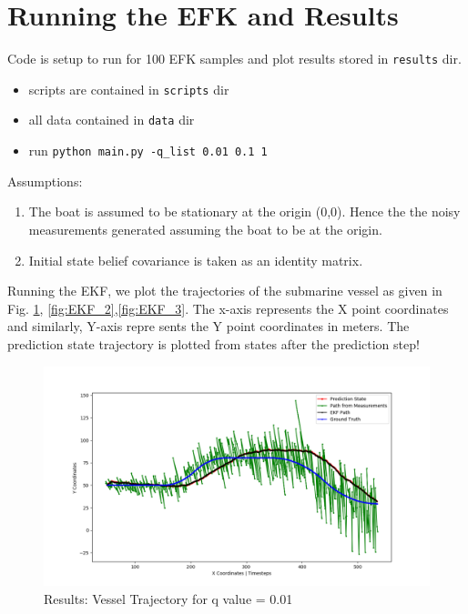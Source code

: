 \documentclass[12pt]{article}
\begin{document}
       
\section{Running the  EFK and Results}
Code is setup to run for 100 EFK samples and plot results stored in \texttt{results} dir.
\begin{itemize}
\item scripts are contained in \texttt{scripts} dir
\item all data contained in \texttt{data} dir
\item run \texttt{python main.py -q\_list 0.01 0.1 1}
\end{itemize}

Assumptions:
\begin{enumerate}
\item The boat is assumed to be stationary at the origin (0,0). Hence the the noisy measurements generated assuming the boat to be at the origin.
\item Initial state belief covariance is taken as an identity matrix.

\end{enumerate}
 
Running the EKF, we plot the trajectories of the submarine vessel as given in Fig. \ref{fig:EKF_1}, \ref{fig:EKF_2},\ref{fig:EKF_3}. The x-axis represents the X point coordinates and similarly,  Y-axis repre	sents the Y point coordinates in meters. The prediction state trajectory is plotted from states after the prediction step!

  \begin{figure}[!h]
\centering
\includegraphics[width=\textwidth]{../results/path_q0_01.png}
\caption{Results: Vessel Trajectory for q value = 0.01}
\label{fig:EKF_1}
\end{figure}
\end{document}
